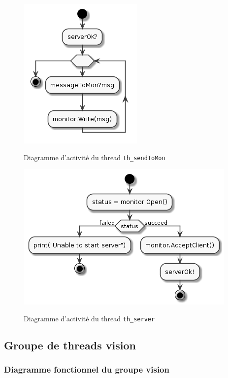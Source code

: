 \documentclass[11pt, a4paper]{paper}
\begin{document}
\begin{figure}[htbp]
\label{fig:act_envoyer}
\begin{center}
{\includegraphics[scale=.3]{./figures-pdf/th_sendToMon}}
{\caption{Diagramme d'activité du thread {\tt th\_sendToMon}}}
\end{center}
\end{figure}


\begin{figure}[htbp]
\label{fig:act_envoyer}
\begin{center}
{\includegraphics[scale=.3]{./figures-pdf/th_server}}
{\caption{Diagramme d'activité du thread {\tt th\_server}}}
\end{center}
\end{figure}
\FloatBarrier

\subsection{Groupe de threads vision}

\subsubsection{Diagramme fonctionnel du groupe vision}
\end{document}
